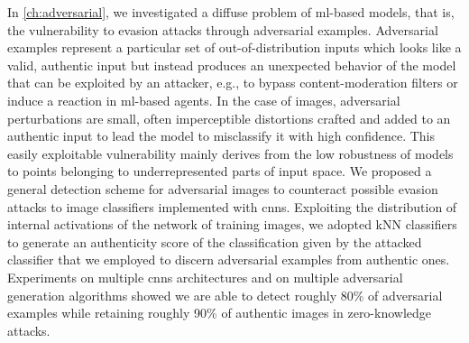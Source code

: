 In \ref{ch:adversarial}, we investigated a diffuse problem of \gls{ml}-based models, that is, the vulnerability to evasion attacks through adversarial examples.
Adversarial examples represent a particular set of out-of-distribution inputs which looks like a valid, authentic input but instead produces an unexpected behavior of the model that can be exploited by an attacker, e.g., to bypass content-moderation filters or induce a reaction in \gls{ml}-based agents.
In the case of images, adversarial perturbations are small, often imperceptible distortions crafted and added to an authentic input to lead the model to misclassify it with high confidence.
This easily exploitable vulnerability mainly derives from the low robustness of models to points belonging to underrepresented parts of input space.
We proposed a general detection scheme for adversarial images to counteract possible evasion attacks to image classifiers implemented with \glspl{cnn}.
Exploiting the distribution of internal activations of the network of training images, we adopted kNN classifiers to generate an authenticity score of the classification given by the attacked classifier that we employed to discern adversarial examples from authentic ones.
Experiments on multiple \glspl{cnn} architectures and on multiple adversarial generation algorithms showed we are able to detect roughly 80\% of adversarial examples while retaining roughly 90\% of authentic images in zero-knowledge attacks.